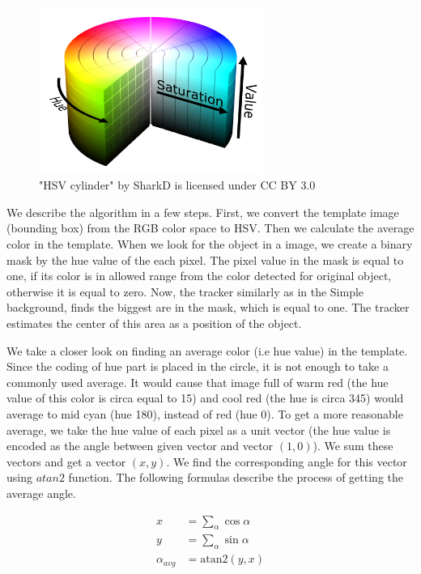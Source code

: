 \begin{figure}[h!]\centering
\includegraphics[width=0.65\textwidth]{img/hsv-cylinder.png}
\caption[Blah]{"HSV cylinder" by SharkD is licensed under CC BY 3.0 \footnotemark}
\end{figure}

We describe the algorithm in a few steps. First, we convert the template image
(bounding box) from the RGB color space to HSV. Then we calculate the average
color in the template. When we look for the object in a image, we create a
binary mask by the hue value of the each pixel. The pixel value in the mask is
equal to one, if its color is in allowed range from the color detected for
original object, otherwise it is equal to zero. Now, the tracker similarly as
in the Simple background, finds the biggest are in the mask, which is equal to
one. The tracker estimates the center of this area as a position of the object.

We take a closer look on finding an average color (i.e hue value) in the
template.  Since the coding of hue part is placed in the circle, it is not
enough to take a commonly used average. It would cause that image full of warm
red (the hue value of this color is circa equal to 15) and cool red (the hue is
circa 345) would average to mid cyan (hue 180), instead of red (hue 0). To get
a more reasonable average, we take the hue value of each pixel as a unit vector
(the hue value is encoded as the angle between given vector and vector $(1,
0)$). We sum these vectors and get a vector $(x, y)$. We find the corresponding
angle for this vector using $atan2$ function. The following formulas describe
the process of getting the average angle.


$$
\begin{aligned}
x &= \sum_\alpha \cos \alpha \\
y &= \sum_\alpha \sin \alpha \\
\alpha_{avg} &= \text{atan2}(y, x)
\end{aligned}
$$

